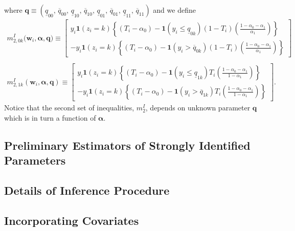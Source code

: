 where $\mathbf{q} \equiv ( \underline{q}_{00},\, \overline{q}_{00},\, \underline{q}_{10}, \,\overline{q}_{10},\, \underline{q}_{01}, \,\overline{q}_{01},\, \underline{q}_{11},\, \overline{q}_{11})$ and we define
\begin{align}
  m_{2,0k}^I\big(\mathbf{w}_i, \boldsymbol{\alpha}, \mathbf{q}) \equiv \left[
  \begin{array}{r}
    y_i \mathbf{1}\left( z_i=k \right)\left\{(T_i - \alpha_0) - \mathbf{1}(y_i \leq \underline{q}_{0k})  (1 - T_i)\left( \frac{1 - \alpha_0 - \alpha_1}{\alpha_1} \right)\right\} \\
    - y_i \mathbf{1}(z_i=k) \left\{ (T_i - \alpha_0) -  \mathbf{1}(y_i > \overline{q}_{0k}) (1 - T_i) \left( \frac{1 - \alpha_0 - \alpha_1}{\alpha_1} \right) \right\} 
\end{array}
\right] \\\nonumber \\
  m_{2,1k}^I(\mathbf{w}_i, \boldsymbol{\alpha}, \mathbf{q}) \equiv \left[
  \begin{array}{r}
    y_i \mathbf{1}\left( z_i=k \right)\left\{(T_i - \alpha_0) - \mathbf{1}(y_i \leq \underline{q}_{1k})  T_i\left( \frac{1 - \alpha_0 - \alpha_1}{1 - \alpha_1} \right)\right\} \\
    - y_i \mathbf{1}(z_i=k) \left\{ (T_i - \alpha_0) -  \mathbf{1}(y_i > \overline{q}_{1k}) T_i \left( \frac{1 - \alpha_0 - \alpha_1}{1 - \alpha_1} \right) \right\} 
\end{array}
\right].
\end{align}
Notice that the second set of inequalities, $m_2^I$, depends on unknown parameter $\mathbf{q}$ which is in turn a function of $\boldsymbol{\alpha}$.



\subsection{Preliminary Estimators of Strongly Identified Parameters}
\label{sec:prelim}

\subsection{Details of Inference Procedure}
\label{sec:details}

\subsection{Incorporating Covariates}
\label{sec:covariates}
